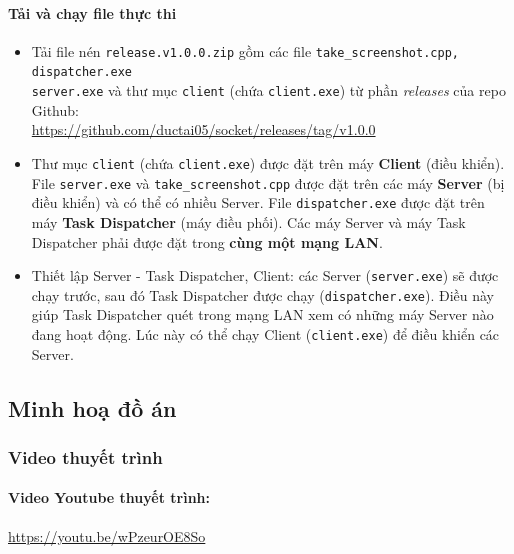 \paragraph{Tải và chạy file thực thi}
\begin{itemize}
    \item Tải file nén \texttt{release.v1.0.0.zip} gồm các file \texttt{take\_screenshot.cpp, dispatcher.exe\\ server.exe} và thư mục \texttt{client} (chứa \texttt{client.exe}) từ phần \textit{releases} của repo Github: \\\href{https://github.com/ductai05/socket/releases/tag/v1.0.0}{https://github.com/ductai05/socket/releases/tag/v1.0.0} \cite{release}
    \item Thư mục \texttt{client} (chứa \texttt{client.exe}) được đặt trên máy \textbf{Client} (điều khiển). File \texttt{server.exe} và \texttt{take\_screenshot.cpp} được đặt trên các máy \textbf{Server} (bị điều khiển) và có thể có nhiều Server. File \texttt{dispatcher.exe} được đặt trên máy \textbf{Task Dispatcher} (máy điều phối). Các máy Server và máy Task Dispatcher phải được đặt trong \textbf{cùng một mạng LAN}.
    \item Thiết lập Server - Task Dispatcher, Client: các Server (\texttt{server.exe}) sẽ được chạy trước, sau đó Task Dispatcher được chạy (\texttt{dispatcher.exe}). Điều này giúp Task Dispatcher quét trong mạng LAN xem có những máy Server nào đang hoạt động. Lúc này có thể chạy Client (\texttt{client.exe}) để điều khiển các Server.
\end{itemize}

\subsection{Minh hoạ đồ án}
\subsubsection{Video thuyết trình}

\paragraph{Video Youtube thuyết trình:}
{\href{https://youtu.be/wPzeurOE8So}{https://youtu.be/wPzeurOE8So}} \cite{youtube}

